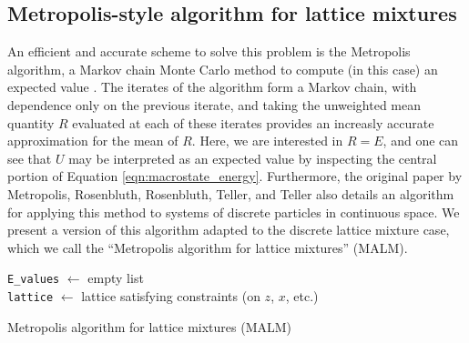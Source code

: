 \documentclass[10pt]{article}
\begin{document}
\subsection{Metropolis-style algorithm for lattice mixtures}
An efficient and accurate scheme to solve this problem is the Metropolis algorithm, a Markov chain Monte Carlo method to compute (in this case) an expected value \cite{md} \cite{metropolis_hastings}.
The iterates of the algorithm form a Markov chain, with dependence only on the previous iterate, and taking the unweighted mean quantity $R$ evaluated at each of these iterates provides an increasly accurate approximation for the mean of $R$.
Here, we are interested in $R=E$, and one can see that $U$ may be interpreted as an expected value by inspecting the central portion of Equation \ref{eqn:macrostate_energy}.
Furthermore, the original paper by Metropolis, Rosenbluth, Rosenbluth, Teller, and Teller also details an algorithm for applying this method to systems of discrete particles in continuous space.
We present a version of this algorithm adapted to the discrete lattice mixture case, which we call the ``Metropolis algorithm for lattice mixtures'' (MALM).

\begin{algorithm}[H]
    \SetAlgoLined
    \texttt{E\_values} $\gets$ empty list \\
    \texttt{lattice} $\gets$ lattice satisfying constraints (on $z$, $x$, etc.) \\
    \caption{Metropolis algorithm for lattice mixtures (MALM)}
    \label{alg:malm}
\end{algorithm}
\end{document}
